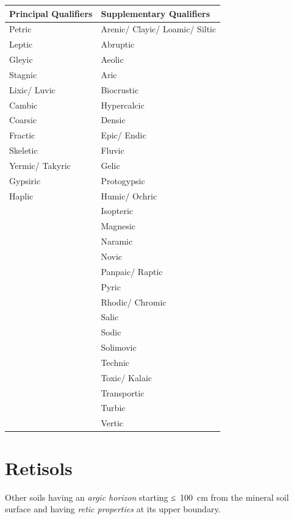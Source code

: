 \documentclass[
  letterpaper,
  DIV=11,
  numbers=noendperiod]{scrreprt}
\begin{document}
\begin{longtable}[]{@{}ll@{}}
\toprule()
Principal Qualifiers & Supplementary Qualifiers \\
\midrule()
\endhead
Petric & Arenic/ Clayic/ Loamic/ Siltic \\
Leptic & Abruptic \\
Gleyic & Aeolic \\
Stagnic & Aric \\
Lixic/ Luvic & Biocrustic \\
Cambic & Hypercalcic \\
Coarsic & Densic \\
Fractic & Epic/ Endic \\
Skeletic & Fluvic \\
Yermic/ Takyric & Gelic \\
Gypsiric & Protogypsic \\
Haplic & Humic/ Ochric \\
& Isopteric \\
& Magnesic \\
& Naramic \\
& Novic \\
& Panpaic/ Raptic \\
& Pyric \\
& Rhodic/ Chromic \\
& Salic \\
& Sodic \\
& Solimovic \\
& Technic \\
& Toxic/ Kalaic \\
& Transportic \\
& Turbic \\
& Vertic \\
\bottomrule()
\end{longtable}


\hypertarget{key-retisols}{%
\chapter{Retisols}\label{key-retisols}}

Other soils having an \emph{argic horizon} starting ≤~100~cm from the
mineral soil surface and having \emph{retic properties} at its upper
boundary.
\end{document}
